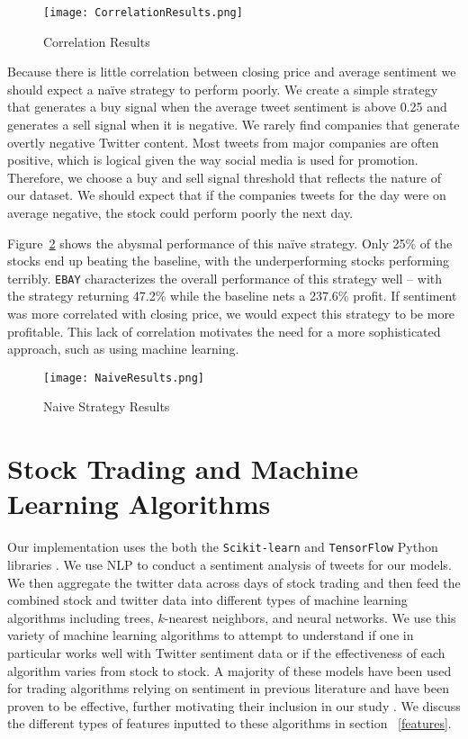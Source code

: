 \documentclass[../thesis.tex]{subfiles}
\begin{document}
\begin{figure}[h]
\centering
\texttt{[image: CorrelationResults.png]}
\caption{Correlation Results \label{overflow}}
\label{Corrfigure}
\end{figure}

Because there is little correlation between closing price and average sentiment we should expect a na\"{i}ve strategy to perform poorly. We create a simple strategy that generates a buy signal when the average tweet sentiment is above 0.25 and generates a sell signal when it is negative. We rarely find companies that generate overtly negative Twitter content. Most tweets from major companies are often positive, which is logical given the way social media is used for promotion. Therefore, we choose a buy and sell signal threshold that reflects the nature of our dataset. We should expect that if the companies tweets for the day were on average negative, the stock could perform poorly the next day. 

Figure~\ref{Naivefigure} shows the abysmal performance of this na\"{i}ve strategy. Only 25\% of the stocks end up beating the baseline, with the underperforming stocks performing terribly. \texttt{EBAY} characterizes the overall performance of this strategy well -- with the strategy returning 47.2\% while the baseline nets a 237.6\% profit. If sentiment was more correlated with closing price, we would expect this strategy to be more profitable. This lack of correlation motivates the need for a more sophisticated approach, such as using machine learning. 

\begin{figure}[h]
\centering
\texttt{[image: NaiveResults.png]}
\caption{Naive Strategy Results \label{overflow}}
\label{Naivefigure}
\end{figure}


\section{Stock Trading and Machine Learning Algorithms}
\label{tradingmlsection}

Our implementation uses the both the \texttt{Scikit-learn} and \texttt{TensorFlow} Python libraries \cite{PedregosaFABIANPEDREGOSA2011} \cite{Abadi}. We use NLP to conduct a sentiment analysis of tweets for our models. We then aggregate the twitter data across days of stock trading and then feed the combined stock and twitter data into different types of machine learning algorithms including trees, $k$-nearest neighbors, and neural networks. We use this variety of machine learning algorithms to attempt to understand if one in particular works well with Twitter sentiment data or if the effectiveness of each algorithm varies from stock to stock. A majority of these models have been used for trading algorithms relying on sentiment in previous literature and have been proven to be effective, further motivating their inclusion in our study \cite{Bollen} \cite{Mao2013} \cite{Shah2014}. We discuss the different types of features inputted to these algorithms in section ~\ref{features}. 
\end{document}
